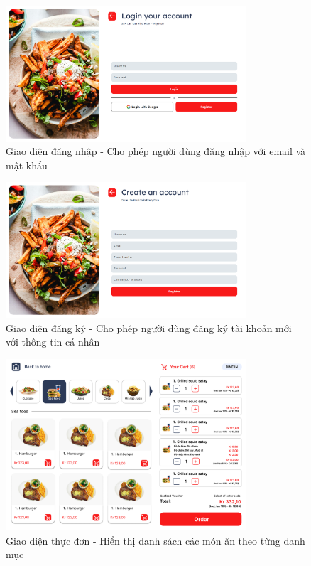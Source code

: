 \documentclass[a4paper]{article}
\begin{document}
\begin{itemize}
    \begin{figure}[H]
        \centering
        \includegraphics[width=0.8\textwidth]{login.png}
        \caption{Giao diện đăng nhập - Cho phép người dùng đăng nhập với email và mật khẩu}
    \end{figure}
    
    \begin{figure}[H]
        \centering
        \includegraphics[width=0.8\textwidth]{register.png}
        \caption{Giao diện đăng ký - Cho phép người dùng đăng ký tài khoản mới với thông tin cá nhân}
    \end{figure}
    
    \begin{figure}[H]
        \centering
        \includegraphics[width=0.8\textwidth]{figmaMenu.png}
        \caption{Giao diện thực đơn - Hiển thị danh sách các món ăn theo từng danh mục}
    \end{figure}
    

\end{itemize}
\end{document}
